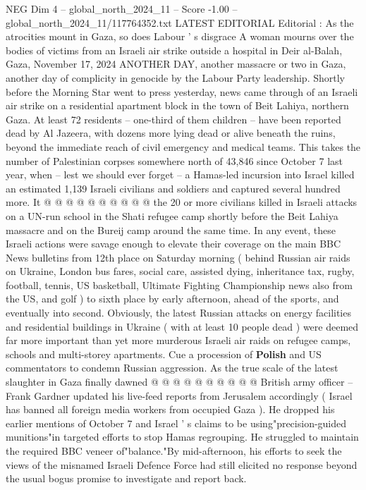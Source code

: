 \begin{textsample}{NEG Dim 4 – global\_north\_2024\_11 – Score -1.00 – global\_north\_2024\_11/117764352.txt}  \label{ex:f4_neg_162}
LATEST EDITORIAL Editorial : As the atrocities mount in Gaza, so does Labour ' s disgrace A woman mourns over the bodies of victims from an Israeli air strike outside a hospital in Deir al-Balah, Gaza, November 17, 2024 ANOTHER DAY, another massacre or two in Gaza, another day of complicity in genocide by the Labour Party leadership.
Shortly before the Morning Star went to press yesterday, news came through of an Israeli air strike on a residential apartment block in the town of Beit Lahiya, northern Gaza.
At least 72 residents -- one-third of them children -- have been reported dead by Al Jazeera, with dozens more lying dead or alive beneath the ruins, beyond the immediate reach of civil emergency and medical teams.
This takes the number of Palestinian corpses somewhere north of 43,846 since October 7 last year, when -- lest we should ever forget -- a Hamas-led incursion into Israel killed an estimated 1,139 Israeli civilians and soldiers and captured several hundred more.
It @ @ @ @ @ @ @ @ @ @ the 20 or more civilians killed in Israeli attacks on a UN-run school in the Shati refugee camp shortly before the Beit Lahiya massacre and on the Bureij camp around the same time.
In any event, these Israeli actions were savage enough to elevate their coverage on the main BBC News bulletins from 12th place on Saturday morning ( behind Russian air raids on Ukraine, London bus fares, social care, assisted dying, inheritance tax, rugby, football, tennis, US basketball, Ultimate Fighting Championship news also from the US, and golf ) to sixth place by early afternoon, ahead of the sports, and eventually into second.
Obviously, the latest Russian attacks on energy facilities and residential buildings in Ukraine ( with at least 10 people dead ) were deemed far more important than yet more murderous Israeli air raids on refugee camps, schools and multi-storey apartments.
Cue a procession of \textbf{Polish} and US commentators to condemn Russian aggression.
As the true scale of the latest slaughter in Gaza finally dawned @ @ @ @ @ @ @ @ @ @ British army officer -- Frank Gardner updated his live-feed reports from Jerusalem accordingly ( Israel has banned all foreign media workers from occupied Gaza ).
He dropped his earlier mentions of October 7 and Israel ' s claims to be using"precision-guided munitions"in targeted efforts to stop Hamas regrouping.
He struggled to maintain the required BBC veneer of"balance."By mid-afternoon, his efforts to seek the views of the misnamed Israeli Defence Force had still elicited no response beyond the usual bogus promise to investigate and report back.

\end{textsample}
